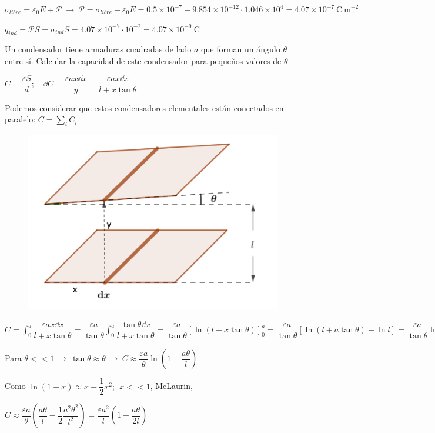 $\sigma_{libre}=\varepsilon_0E+\mathcal P \ \to \ \mathcal P=\sigma_{libre}-\varepsilon_0E=0.5\times 10^{-7}-9.854\times 10^{-12}\cdot 1.046\times 10^4=4.07\times 10^{-7} \ \mathrm{C\ m}^{-2}$

$q_{ind}=\mathcal P S=\sigma_{ind}S=4.07\times 10^{-7} \cdot 10^{-2}=4.07\times 10^{-9} \ \mathrm{C}$

\begin{prob}
Un condensador tiene armaduras cuadradas de lado $a$ que forman un ángulo $\theta$ entre sí. Calcular la capacidad de este condensador para pequeños valores de $\theta$	
\end{prob}

$C=\dfrac {\varepsilon S}{d}; \quad \dd C=\dfrac {\varepsilon a x \dd x}{y}=\dfrac{\varepsilon a x \dd x}{l+x\tan \theta}$

Podemos considerar que estos condensadores elementales están conectados en paralelo: $C=\sum_i C_i$

\begin{figure}[H]
	\centering
	\includegraphics[width=.5\textwidth]{imagenes/imagenes24/T24IM18.png}
\end{figure}

$\displaystyle C=\int_0^a \dfrac{\varepsilon a x \dd x}{l+x\tan \theta}=\dfrac{\varepsilon a}{\tan \theta} \int_0^a \dfrac{\tan \theta  \dd x}{l+x\tan \theta} = \dfrac{\varepsilon a}{\tan \theta} \left[ \ln (l+x\tan \theta) \right]_0^a = \dfrac {\varepsilon a}{\tan \theta} [ \ln(l+a\tan \theta)-\ln l ]=\dfrac{\varepsilon a}{\tan \theta} \ln \left( 1+\dfrac{a \tan \theta}{l} \right) $

Para $\theta <<1 \ \to \ \tan \theta \approx \theta \ \to \ C\approx \dfrac{\varepsilon a}{\theta} \ln \left( 1+\dfrac{a \theta}{l} \right)$

Como $\ln(1+x) \approx x-\dfrac 1 2 x^2;\ \ x<<1$, McLaurin,

$C\approx \dfrac{\varepsilon a}{\theta} \left( \dfrac {a \theta}{l} - \dfrac 1 2 \dfrac {a^2 \theta^2}{l^2} \right)= \dfrac{\varepsilon a^2}{l} \left( 1 - \dfrac{a\theta}{2l} \right)$



